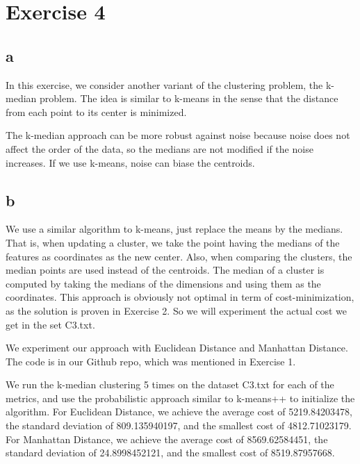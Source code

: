 \section*{Exercise 4}
\subsection*{a}
In this exercise, we consider another variant of the clustering problem, the
k-median problem. The idea is similar to k-means in the sense that the distance
from each point to its center is minimized.

The k-median approach can be more robust against noise because noise does not 
affect the order of the data, so the medians are not modified if the noise 
increases. If we use k-means, noise can biase the centroids. 

\subsection*{b}
We use a similar algorithm to k-means, just replace the means by the medians. That is, when updating a cluster, we take the point having the medians of the features as coordinates as the new center. Also, when comparing the clusters, the median points are used instead of the centroids. The median of a cluster is computed by taking the medians of the dimensions and using them as the coordinates. This approach is obviously not optimal in term of cost-minimization, as the solution is proven in Exercise 2. So we will experiment the actual cost we get in the set C3.txt.

We experiment our approach with Euclidean Distance and Manhattan Distance. The code is in our Github repo, which was mentioned in Exercise 1.

We run the k-median clustering 5 times on the dataset C3.txt for each of the metrics, and use the probabilistic approach similar to k-means++ to initialize the algorithm. For Euclidean Distance, we achieve the average cost of 5219.84203478, the standard deviation of 809.135940197, and the smallest cost of 4812.71023179. For Manhattan Distance, we achieve the average cost of 8569.62584451, the standard deviation of 24.8998452121, and the smallest cost of 8519.87957668.

